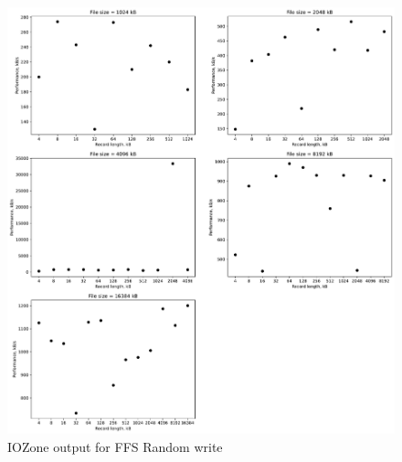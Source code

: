 \begin{figure}[!htb]
	\label{fig:app_bench_ffs_rnd_write}
	\begin{center}
		\includegraphics[width=1.0\textwidth]{figures/benchmarking/ffs/Random write.pdf}
	\end{center}
	\caption{IOZone output for FFS Random write}
\end{figure}

